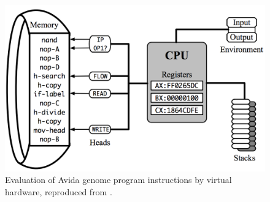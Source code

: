 \begin{figure}[h]
   \includegraphics[width=\columnwidth]{imgs/virtual_hardware}
  \caption{\small Evaluation of Avida genome program instructions by virtual hardware, reproduced from \citep{Ofria:2009avida}.}
  \label{fig:vhardware}
\end{figure}